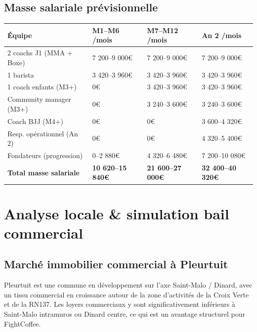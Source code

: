 \documentclass[11pt, a4paper]{article}
\newcommand{\eyebrow}[1]{%
  \vspace{4pt}{\small\color{fc-ink3}\texttt{— #1}}\vspace{2pt}
}
\begin{document}
\subsection{Masse salariale prévisionnelle}

\begin{center}
\begin{tabular}{@{}p{5cm}p{3cm}p{3cm}p{3cm}@{}}
\toprule
\rowcolor{fc-ink}\color{white}\textbf{Équipe} & \color{white}\textbf{M1–M6 /mois} & \color{white}\textbf{M7–M12 /mois} & \color{white}\textbf{An 2 /mois} \\
\midrule
2 coachs J1 (MMA + Boxe) & 7 200–9 000€ & 7 200–9 000€ & 7 200–9 000€ \\
\rowcolor{fc-bg2} 1 barista & 3 420–3 960€ & 3 420–3 960€ & 3 420–3 960€ \\
1 coach enfants (M3+) & 0€ & 3 420–3 960€ & 3 420–3 960€ \\
\rowcolor{fc-bg2} Community manager (M3+) & 0€ & 3 240–3 600€ & 3 240–3 600€ \\
Coach BJJ (M4+) & 0€ & 0€ & 3 600–4 320€ \\
\rowcolor{fc-bg2} Resp. opérationnel (An 2) & 0€ & 0€ & 4 320–5 400€ \\
Fondateurs (progression) & 0–2 880€ & 4 320–6 480€ & 7 200–10 080€ \\
\midrule
\textbf{Total masse salariale} & \textbf{10 620–15 840€} & \textbf{21 600–27 000€} & \textbf{32 400–40 320€} \\
\bottomrule
\end{tabular}
\end{center}

\section{Analyse locale \& simulation bail commercial}
\eyebrow{D — ANALYSE LOCALE \& BAIL}

\subsection{Marché immobilier commercial à Pleurtuit}

Pleurtuit est une commune en développement sur l'axe Saint-Malo / Dinard, avec un tissu commercial en croissance autour de la zone d'activités de la Croix Verte et de la RN137. Les loyers commerciaux y sont significativement inférieurs à Saint-Malo intramuros ou Dinard centre, ce qui est un avantage structurel pour FightCoffee.
\end{document}
